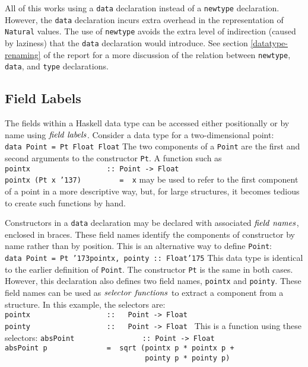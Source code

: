 All of this works using a \mbox{\tt data} declaration instead of a
\mbox{\tt newtype} declaration.  However, the \mbox{\tt data} declaration 
incurs extra overhead in the representation of \mbox{\tt Natural} values.  The
use of \mbox{\tt newtype} avoids the extra level of indirection (caused by
laziness) that the \mbox{\tt data} declaration would introduce.  
See section 
\ref{datatype-renaming} of the report for a more discussion of the
relation between \mbox{\tt newtype}, \mbox{\tt data}, and \mbox{\tt type} declarations.
 

\subsection{Field Labels}

The fields within a Haskell data type can be accessed either
positionally or by name using \mbox{$\it field\ labels$}.
Consider a data type for a two-dimensional point:
\bprog
\mbox{\tt data\ Point\ =\ Pt\ Float\ Float}
\eprog
The two components of a \mbox{\tt Point} are the first and second arguments to the
constructor \mbox{\tt Pt}.  A function such as
\bprog
\mbox{\tt pointx\ \ \ \ \ \ \ \ \ \ \ \ \ \ \ \ \ \ ::\ Point\ ->\ Float}\\
\mbox{\tt pointx\ (Pt\ x\ {\char'137})\ \ \ \ \ \ \ \ \ =\ \ x}
\eprog
may be used to refer to the first component of a point in a more
descriptive way, but, for large structures, it becomes tedious to
create such functions by hand.

Constructors in a \mbox{\tt data} declaration may be declared
with associated \mbox{$\it field\ names$}, enclosed in braces.  These field names
identify the components of constructor by name rather than by position.
This is an alternative way to define \mbox{\tt Point}:
\bprog
\mbox{\tt data\ Point\ =\ Pt\ {\char'173}pointx,\ pointy\ ::\ Float{\char'175}}
\eprog
This data type is identical to the earlier definition
of \mbox{\tt Point}.  The constructor \mbox{\tt Pt} is the same in both cases.  However,
this declaration also defines two field names, \mbox{\tt pointx}
and \mbox{\tt pointy}.  These field names can be used as \mbox{$\it selector\ functions$} to
extract a component from a structure.  In this example, the selectors
are:
\bprog
\mbox{\tt pointx\ \ \ \ \ \ \ \ \ \ \ \ \ \ \ \ \ \ ::\ \ \ Point\ ->\ Float\ }\\
\mbox{\tt pointy\ \ \ \ \ \ \ \ \ \ \ \ \ \ \ \ \ \ ::\ \ \ Point\ ->\ Float\ }
\eprog
This is a function using these selectors: 
\bprog
\mbox{\tt absPoint\ \ \ \ \ \ \ \ \ \ \ \ \ \ \ \ ::\ Point\ ->\ Float}\\
\mbox{\tt absPoint\ p\ \ \ \ \ \ \ \ \ \ \ \ \ \ =\ \ sqrt\ (pointx\ p\ *\ pointx\ p\ +\ }\\
\mbox{\tt \ \ \ \ \ \ \ \ \ \ \ \ \ \ \ \ \ \ \ \ \ \ \ \ \ \ \ \ \ \ \ \ \ pointy\ p\ *\ pointy\ p)}
\eprog

